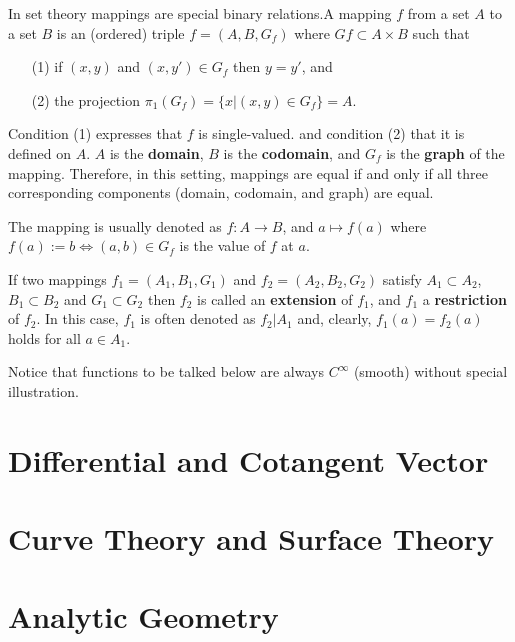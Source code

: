 \begin{definition}[Mapping]
	\cite{3}
	In set theory mappings are special binary relations.A mapping $f$ from a set $A$ to a set $B$ is an (ordered) triple $f=(A,B,G_f)$
 	where $Gf\subset A\times B$ such that

	\begin{itemize}
		\item[(1)] if $(x,y)$ and $(x,y')\in G_f$ then $y=y'$, and
		\item[(2)] the projection $\pi_1(G_f)=\{x|(x,y)\in G_f\}=A.$
	\end{itemize}

	Condition (1) expresses that $f$ is single-valued. and condition (2) that it is defined on $A$.
	$A$ is the \textbf{domain}, $B$ is the \textbf{codomain}, and $G_f$ is the \textbf{graph} of the mapping. Therefore, in this setting, mappings are equal if and only if all three corresponding components (domain, codomain, and graph) are equal.
	
	The mapping is usually denoted as $f:A\to B$, and $a\mapsto f(a)$ where $f(a):=b\Leftrightarrow (a,b)\in G_f$ is the value of $f$ at $a$.

\end{definition}

If two mappings $f_1=(A_1,B_1,G_1)$ and $f_2=(A_2,B_2,G_2)$ satisfy $A_1\subset A_2$, $B_1\subset B_2$ and $G_1\subset G_2$
then $f_2$ is called an \textbf{extension} of $f_1$, and $f_1$ a \textbf{restriction} of $f_2$.
In this case, $f_1$ is often denoted as $f_2|A_1$ and, clearly, $f_1(a)=f_2(a)$ holds for all $a\in A_1$.

\begin{center}
	\begin{tcolorbox}[colback=gray!10,%
					  colframe=black,%
					  width=12cm,%
					  arc=1mm, auto outer arc,
					  boxrule=0.5pt,
					 ]
	Notice that functions to be talked below are always $C^{\infty}$ (smooth) without special illustration.
	\end{tcolorbox}
\end{center}





\section{Differential and Cotangent Vector}
\section{Curve Theory and Surface Theory}
\section{Analytic Geometry}
